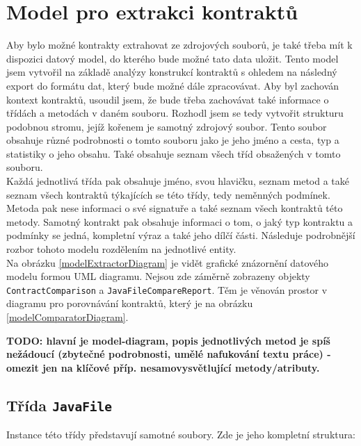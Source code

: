 	
	\section{Model pro extrakci kontraktů}
			Aby bylo možné kontrakty extrahovat ze zdrojových souborů, je také třeba mít k dispozici datový model, do kterého bude možné tato data uložit. Tento model jsem vytvořil na základě analýzy konstrukcí kontraktů s ohledem na následný export do formátu dat, který bude možné dále zpracovávat. Aby byl zachován kontext kontraktů, usoudil jsem, že bude třeba zachovávat také informace o třídách a metodách v daném souboru. Rozhodl jsem se tedy vytvořit strukturu podobnou stromu, jejíž kořenem je samotný zdrojový soubor. Tento soubor obsahuje různé podrobnosti o tomto souboru jako je jeho jméno a cesta, typ a statistiky o jeho obsahu. Také obsahuje seznam všech tříd obsažených v tomto souboru.\\
			
			Každá jednotlivá třída pak obsahuje jméno, svou hlavičku, seznam metod a také seznam všech kontraktů týkajících se této třídy, tedy neměnných podmínek. Metoda pak nese informaci o své signatuře a také seznam všech kontraktů této metody. Samotný kontrakt pak obsahuje informaci o tom, o jaký typ kontraktu a podmínky se jedná, kompletní výraz a také jeho dílčí části. Následuje podrobnější rozbor tohoto modelu rozdělením na jednotlivé entity.\\
			
			Na obrázku \ref{modelExtractorDiagram} je vidět grafické znázornění datového modelu formou UML diagramu. Nejsou zde záměrně zobrazeny objekty \texttt{ContractComparison} a \texttt{JavaFileCompareReport}. Těm je věnován prostor v diagramu pro porovnávání kontraktů, který je na obrázku \ref{modelComparatorDiagram}. 
			
			\textbf{\textcolor{pblue}{TODO: hlavní je model-diagram, popis jednotlivých metod je spíš nežádoucí (zbytečné podrobnosti, umělé nafukování textu práce) - omezit jen na klíčové příp. nesamovysvětlující metody/atributy.}}\\
									
			
			\subsection{Třída \texttt{JavaFile}}
				Instance této třídy představují samotné soubory. Zde je jeho kompletní struktura:
				

